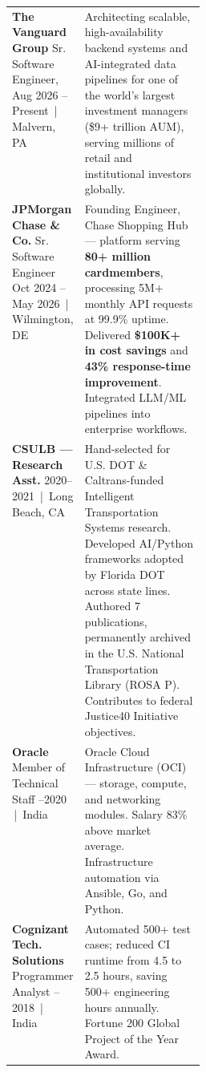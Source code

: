 \documentclass[10pt, letterpaper]{article}
\begin{document}
\vspace{1pt}
\begin{tabularx}{\linewidth}{@{}p{0.28\linewidth}X@{}}

  \textbf{\small\color{navy}The Vanguard Group} \newline
  {\scriptsize\color{graytext}Sr. Software Engineer, Aug 2026 -- Present \,|\, Malvern, PA} &
  {\small Architecting scalable, high-availability backend systems and AI-integrated
  data pipelines for one of the world's largest investment managers (\$9+ trillion AUM),
  serving millions of retail and institutional investors globally.}\\[5pt]

  \textbf{\small\color{navy}JPMorgan Chase \& Co.} \newline
  {\scriptsize\color{graytext}Sr. Software Engineer \newline Oct 2024 -- May 2026 \,|\, Wilmington, DE} &
  {\small Founding Engineer, Chase Shopping Hub --- platform serving \textbf{80+ million
  cardmembers}, processing 5M+ monthly API requests at 99.9\% uptime. Delivered
  \textbf{\$100K+ in cost savings} and \textbf{43\% response-time improvement}.
  Integrated LLM/ML pipelines into enterprise workflows.}\\[5pt]

  \textbf{\small\color{navy}CSULB --- Research Asst.} \newline
  {\scriptsize\color{graytext}2020--2021 \,|\, Long Beach, CA} &
  {\small Hand-selected for U.S. DOT \& Caltrans-funded Intelligent Transportation Systems
  research. Developed AI/Python frameworks adopted by Florida DOT across state lines.
  Authored 7 publications, permanently archived in the U.S. National Transportation
  Library (ROSA P). Contributes to federal Justice40 Initiative objectives.}\\[5pt]

  \textbf{\small\color{navy}Oracle} \newline
  {\scriptsize\color{graytext}Member of Technical Staff \newline 2018--2020 \,|\, India} &
  {\small Oracle Cloud Infrastructure (OCI) --- storage, compute, and networking modules.
  Salary 83\% above market average. Infrastructure automation via Ansible, Go, and Python.}\\[5pt]

  \textbf{\small\color{navy}Cognizant Tech. Solutions} \newline
  {\scriptsize\color{graytext}Programmer Analyst \newline 2014--2018 \,|\, India} &
  {\small Automated 500+ test cases; reduced CI runtime from 4.5 to 2.5 hours, saving
  500+ engineering hours annually. Fortune 200 Global Project of the Year Award.}\\

\end{tabularx}
\end{document}
